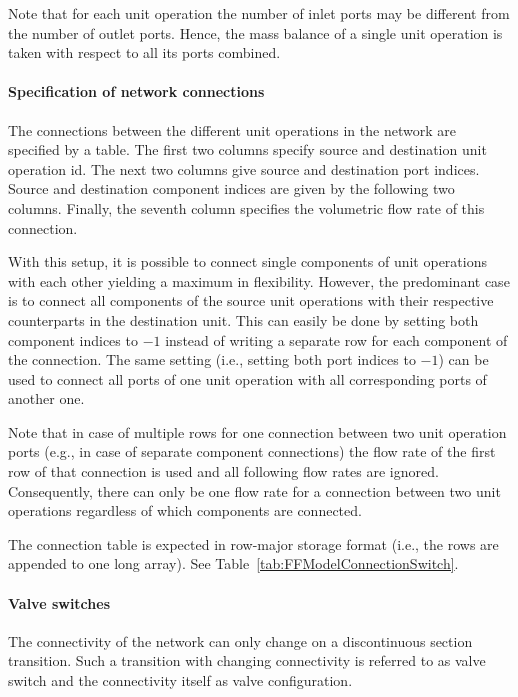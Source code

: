 Note that for each unit operation the number of inlet ports may be different from the number of outlet ports.
Hence, the mass balance of a single unit operation is taken with respect to all its ports combined.

\paragraph{Specification of network connections}
\label{par:MUOPNetworkConfig}

The connections  between the different unit operations in the network are specified by a table.
The first two columns specify source and destination unit operation id.
The next two columns give source and destination port indices.
Source and destination component indices are given by the following two columns.
Finally, the seventh column specifies the volumetric flow rate of this connection.

With this setup, it is possible to connect single components of unit operations with each other yielding a maximum in flexibility.
However, the predominant case is to connect all components of the source unit operations with their respective counterparts in the destination unit.
This can easily be done by setting both component indices to $-1$ instead of writing a separate row for each component of the connection.
The same setting (i.e., setting both port indices to $-1$) can be used to connect all ports of one unit operation with all corresponding ports of another one.

Note that in case of multiple rows for one connection between two unit operation ports (e.g., in case of separate component connections) the flow rate of the first row of that connection is used and all following flow rates are ignored.
Consequently, there can only be one flow rate for a connection between two unit operations regardless of which components are connected.

The connection table is expected in row-major storage format (i.e., the rows are appended to one long array).
See Table~\ref{tab:FFModelConnectionSwitch}.

\paragraph{Valve switches}
\label{par:MUOPNetworkValveSwitches}

The connectivity of the network can only change on a discontinuous section transition.
Such a transition with changing connectivity is referred to as valve switch and the connectivity itself as valve configuration. 

